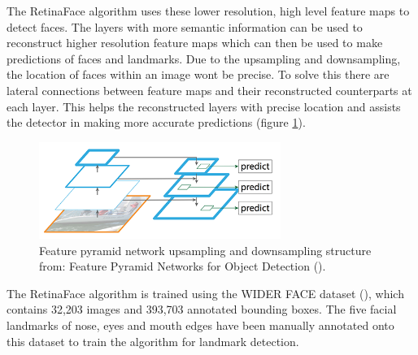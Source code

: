 \documentclass{l4proj}
\begin{document}
The RetinaFace algorithm uses these lower resolution, high level feature maps to detect faces. The layers with more semantic information can be used to reconstruct higher resolution feature maps which can then be used to make predictions of faces and landmarks. Due to the upsampling and downsampling, the location of faces within an image wont be precise. To solve this there are lateral connections between feature maps and their reconstructed counterparts at each layer. This helps the reconstructed layers with precise location and assists the detector in making more accurate predictions (figure \ref{ip_lateral}).
\begin{figure}[h!]
  \centering
  \begin{minipage}{\textwidth}
  \centering
    \includegraphics[width=0.7\textwidth]{images/fp_lateral.png}
    \caption{Feature pyramid network upsampling and downsampling structure from: Feature Pyramid Networks for Object Detection
(\cite{fpn}). }
    \label{ip_lateral}
  \end{minipage}
  \hfill
\end{figure}


The RetinaFace algorithm is trained using the WIDER FACE dataset (\cite{widerface}), which contains 32,203 images and 393,703 annotated bounding boxes. The five facial landmarks of nose, eyes and mouth edges have been manually annotated onto this dataset to train the algorithm for landmark detection.
\end{document}
